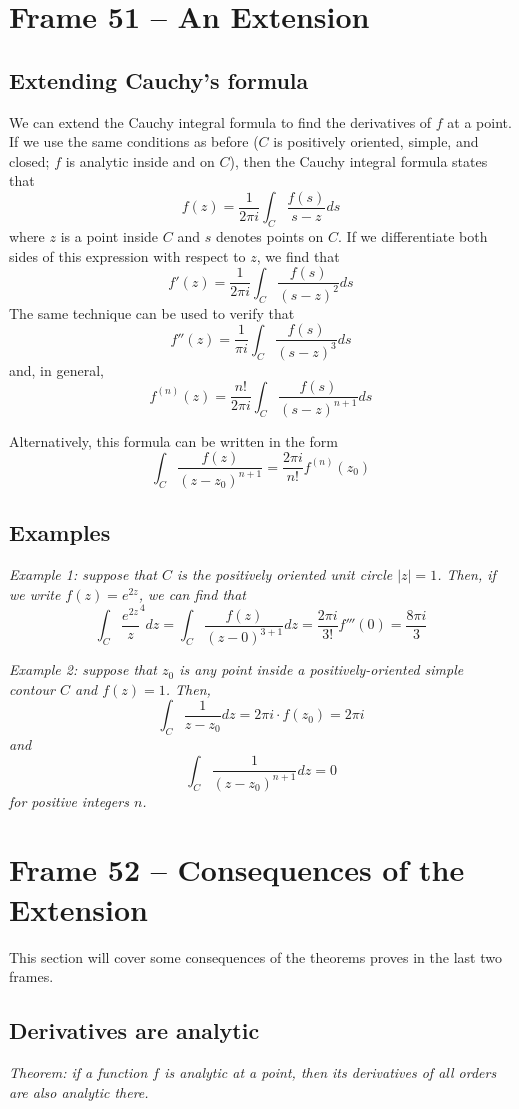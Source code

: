 \documentclass{article}
\begin{document}
\clearpage
\section{Frame 51 -- An Extension}
\subsection{Extending Cauchy's formula}
We can extend the Cauchy integral formula to find the derivatives of $f$ at a point. If we use the same conditions as before ($C$ is positively oriented, simple, and closed; $f$ is analytic inside and on $C$), then the Cauchy integral formula states that
\[
	f(z) = \frac{1}{2\pi i} \int_C \frac{f(s)}{s - z} ds
\]
where $z$ is a point inside $C$ and $s$ denotes points on $C$. If we differentiate both sides of this expression with respect to $z$, we find that
\[
	f'(z) = \frac{1}{2\pi i} \int_C \frac{f(s)}{(s - z)^2} ds
\]
The same technique can be used to verify that
\[
	f''(z) = \frac{1}{\pi i} \int_C \frac{f(s)}{(s - z)^3} ds
\]	
and, in general,
\[
	f^{(n)}(z) = \frac{n!}{2\pi i} \int_C \frac{f(s)}{(s - z)^{n+1}} ds
\]

Alternatively, this formula can be written in the form
\[
	\int_C \frac{f(z)}{(z - z_0)^{n+1}} = \frac{2\pi i}{n!} f^{(n)}(z_0)
\]

\subsection{Examples}
\textit{Example 1: suppose that $C$ is the positively oriented unit circle $|z| = 1$. Then, if we write $f(z) = e^{2z}$, we can find that
\[
	\int_C \frac{e^{2z}} z^4 dz 
	= \int_C \frac{f(z)}{(z - 0)^{3 + 1}} dz
	= \frac{2\pi i}{3!} f'''(0)
	= \frac{8\pi i}{3}
\]}

\textit{Example 2: suppose that $z_0$ is any point inside a positively-oriented simple contour $C$ and $f(z) = 1$. Then,
\[
	\int_C \frac{1}{z - z_0} dz = 2\pi i \cdot f(z_0) = 2\pi i
\]
and
\[
	\int_C \frac{1}{(z - z_0)^{n+1}} dz = 0
\]
for positive integers $n$.}


\clearpage
\section{Frame 52 -- Consequences of the Extension}
This section will cover some consequences of the theorems proves in the last two frames.

\subsection{Derivatives are analytic}
\textit{Theorem: if a function $f$ is analytic at a point, then its derivatives of all orders are also analytic there.}
\end{document}
